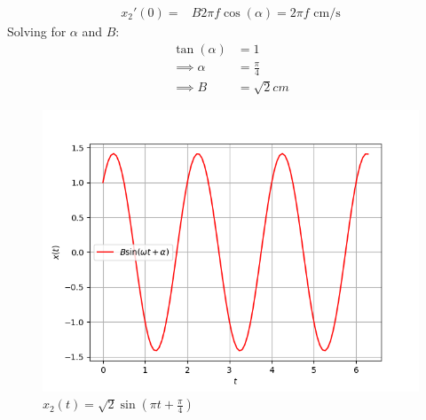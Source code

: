 \documentclass[journal,12pt,twocolumn]{IEEEtran}
\theoremstyle{remark}
\begin{document}
\begin{enumerate}
\begin{align}
    x_2'(0)=& B 2\pi f \cos(\alpha) = 2\pi f \text{ cm/s}
\end{align}
Solving for $\alpha$ and $B$:
\begin{align}
    \tan(\alpha)& = 1\\
\implies
\alpha &= \frac{\pi}{4} \\
\implies 
B &=\sqrt{2}cm
\end{align}
\begin{figure}[h]
\renewcommand\thefigure{2}
    \centering
    \includegraphics[width=0.8\columnwidth]{ncert-physics/11/14/7/figs/fig2.png}
    \caption{$x_2(t) = \sqrt{2}\sin(\pi t + \frac{\pi}{4})$}
    \label{Fig2_11.14.7}
\end{figure}
\end{enumerate}
\end{document}
